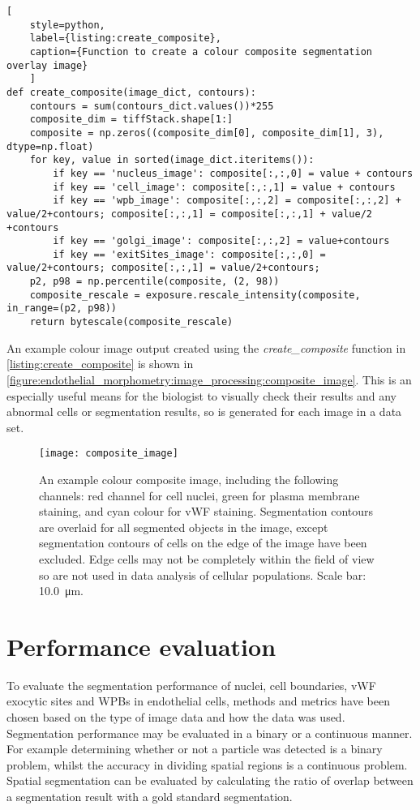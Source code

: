 \begin{lstlisting}[
	style=python,
	label={listing:create_composite},
	caption={Function to create a colour composite segmentation overlay image}
	]
def create_composite(image_dict, contours):
    contours = sum(contours_dict.values())*255
    composite_dim = tiffStack.shape[1:]
    composite = np.zeros((composite_dim[0], composite_dim[1], 3), dtype=np.float)
    for key, value in sorted(image_dict.iteritems()):
        if key == 'nucleus_image': composite[:,:,0] = value + contours
        if key == 'cell_image': composite[:,:,1] = value + contours
        if key == 'wpb_image': composite[:,:,2] = composite[:,:,2] + value/2+contours; composite[:,:,1] = composite[:,:,1] + value/2 +contours
        if key == 'golgi_image': composite[:,:,2] = value+contours
        if key == 'exitSites_image': composite[:,:,0] = value/2+contours; composite[:,:,1] = value/2+contours;
    p2, p98 = np.percentile(composite, (2, 98))
    composite_rescale = exposure.rescale_intensity(composite, in_range=(p2, p98))
    return bytescale(composite_rescale)
\end{lstlisting}

An example colour image output created using the \emph{create\_composite} function in \autoref{listing:create_composite} is shown in \autoref{figure:endothelial_morphometry:image_processing:composite_image}. This is an especially useful means for the biologist to visually check their results and any abnormal cells or segmentation results, so is generated for each image in a data set.

\begin{figure}[htbp!] %
	\centering
	\texttt{[image: composite\_image]}
	\caption[Colour composite image with segmentation contours]{An example colour composite image, including the following channels: red channel for cell nuclei, green for plasma membrane staining, and cyan colour for vWF staining. Segmentation contours are overlaid for all segmented objects in the image, except segmentation contours of cells on the edge of the image have been excluded. Edge cells may not be completely within the field of view so are not used in data analysis of cellular populations. Scale bar: \SI{10.0}{\micro\meter}.}
	\label{figure:endothelial_morphometry:image_processing:composite_image}
\end{figure}

\section{Performance evaluation}
\label{endothelial_morphometry:performance_evaluation}
To evaluate the segmentation performance of nuclei, cell boundaries, vWF exocytic sites and WPBs in endothelial cells, methods and metrics have been chosen based on the type of image data and how the data was used. Segmentation performance may be evaluated in a binary or a continuous manner. For example determining whether or not a particle was detected is a binary problem, whilst the accuracy in dividing spatial regions is a continuous problem. Spatial segmentation can be evaluated by calculating the ratio of overlap between a segmentation result with a gold standard segmentation.

